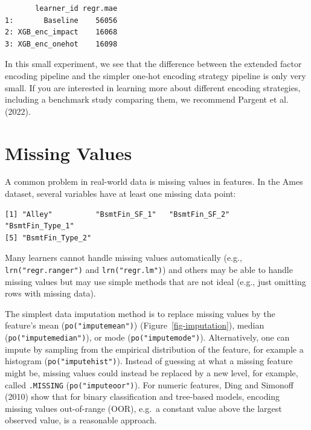 \begin{verbatim}
       learner_id regr.mae
1:       Baseline    56056
2: XGB_enc_impact    16068
3: XGB_enc_onehot    16098
\end{verbatim}

In this small experiment, we see that the difference between the
extended factor encoding pipeline and the simpler one-hot encoding
strategy pipeline is only very small. If you are interested in learning
more about different encoding strategies, including a benchmark study
comparing them, we recommend Pargent et al. (2022).

\hypertarget{sec-preprocessing-missing}{%
\section{Missing Values}\label{sec-preprocessing-missing}}

A common problem in real-world data is missing
values in features. In the Ames dataset, several
variables have at least one missing data point:

\begin{Shaded}
\begin{Highlighting}[]
\NormalTok{(}\SpecialCharTok{$}\NormalTok{() }\SpecialCharTok{\textgreater{}} \NormalTok{))[}\SpecialCharTok{:}\NormalTok{]}
\end{Highlighting}
\end{Shaded}

\begin{verbatim}
[1] "Alley"          "BsmtFin_SF_1"   "BsmtFin_SF_2"   "BsmtFin_Type_1"
[5] "BsmtFin_Type_2"
\end{verbatim}

Many learners cannot handle missing values automatically (e.g.,
\texttt{lrn("regr.ranger")} and \texttt{lrn("regr.lm")}) and others may
be able to handle missing values but may use simple methods that are not
ideal (e.g., just omitting rows with missing data).

The simplest data
imputation method is to replace missing values by
the feature's mean (\texttt{po("imputemean")})
(Figure~\ref{fig-imputation}), median (\texttt{po("imputemedian")}), or
mode (\texttt{po("imputemode")}). Alternatively, one can impute by
sampling from the empirical distribution of the feature, for example a
histogram (\texttt{po("imputehist")}). Instead of guessing at what a
missing feature might be, missing values could instead be replaced by a
new level, for example, called \texttt{.MISSING}
(\texttt{po("imputeoor")}). For numeric features, Ding and Simonoff
(2010) show that for binary classification and tree-based models,
encoding missing values out-of-range (OOR), e.g.~a constant value above
the largest observed value, is a reasonable approach.

